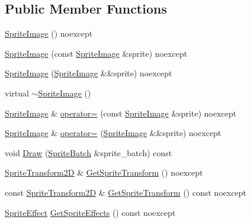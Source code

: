 \subsection*{Public Member Functions}
\begin{DoxyCompactItemize}
\item 
\mbox{\hyperlink{classmage_1_1rendering_1_1_sprite_image_af49f06e0de889dbfd2db264d9e07fc20}{Sprite\+Image}} () noexcept
\item 
\mbox{\hyperlink{classmage_1_1rendering_1_1_sprite_image_a788c62105830b6986a686c6f249c825d}{Sprite\+Image}} (const \mbox{\hyperlink{classmage_1_1rendering_1_1_sprite_image}{Sprite\+Image}} \&sprite) noexcept
\item 
\mbox{\hyperlink{classmage_1_1rendering_1_1_sprite_image_a267b1f56243e020f8cabef5d09c63cae}{Sprite\+Image}} (\mbox{\hyperlink{classmage_1_1rendering_1_1_sprite_image}{Sprite\+Image}} \&\&sprite) noexcept
\item 
virtual \mbox{\hyperlink{classmage_1_1rendering_1_1_sprite_image_a8723b0d72d07773eb4be1c059c7c1fb9}{$\sim$\+Sprite\+Image}} ()
\item 
\mbox{\hyperlink{classmage_1_1rendering_1_1_sprite_image}{Sprite\+Image}} \& \mbox{\hyperlink{classmage_1_1rendering_1_1_sprite_image_acf6e19eaf380ea76e4361778693facf2}{operator=}} (const \mbox{\hyperlink{classmage_1_1rendering_1_1_sprite_image}{Sprite\+Image}} \&sprite) noexcept
\item 
\mbox{\hyperlink{classmage_1_1rendering_1_1_sprite_image}{Sprite\+Image}} \& \mbox{\hyperlink{classmage_1_1rendering_1_1_sprite_image_adabb87110ec41d770061d375cb0db000}{operator=}} (\mbox{\hyperlink{classmage_1_1rendering_1_1_sprite_image}{Sprite\+Image}} \&\&sprite) noexcept
\item 
void \mbox{\hyperlink{classmage_1_1rendering_1_1_sprite_image_a0e4e572bae31d431f670895f98a7895e}{Draw}} (\mbox{\hyperlink{classmage_1_1rendering_1_1_sprite_batch}{Sprite\+Batch}} \&sprite\+\_\+batch) const
\item 
\mbox{\hyperlink{classmage_1_1_sprite_transform2_d}{Sprite\+Transform2D}} \& \mbox{\hyperlink{classmage_1_1rendering_1_1_sprite_image_a0deb8ced92c461e6744d9193464d2c28}{Get\+Sprite\+Transform}} () noexcept
\item 
const \mbox{\hyperlink{classmage_1_1_sprite_transform2_d}{Sprite\+Transform2D}} \& \mbox{\hyperlink{classmage_1_1rendering_1_1_sprite_image_add8c077e8682049e2a3de7b763b06ed9}{Get\+Sprite\+Transform}} () const noexcept
\item 
\mbox{\hyperlink{namespacemage_1_1rendering_a4dbc3536c87b906f1d41d863ec458e78}{Sprite\+Effect}} \mbox{\hyperlink{classmage_1_1rendering_1_1_sprite_image_a82a804fe9ed8c685268a1a42ab853eb4}{Get\+Sprite\+Effects}} () const noexcept

\end{DoxyCompactItemize}
